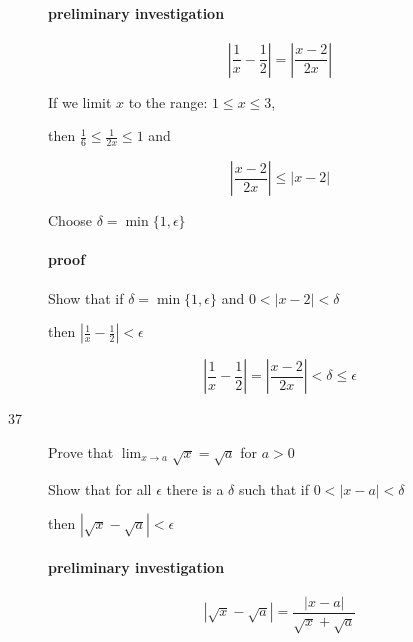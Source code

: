 \documentclass[letterpaper, landscape]{exam}
\begin{document}
\begin{description}
        \paragraph{preliminary investigation}

        \[
          \left| \frac{1}{x} - \frac{1}{2} \right| = \left| \frac{x - 2}{2x} \right| 
        \]

        If we limit $x$ to the range: $1 \leq x \leq 3$, 
        
        then $\frac{1}{6} \leq \frac{1}{2x} \leq 1$ and

        \[
          \left| \frac{x - 2}{2x} \right| \leq |x - 2|
        \]

        Choose $\delta = \min \{ 1, \epsilon \}$

        \paragraph{proof}
        Show that if $\delta = \min \{ 1, \epsilon \}$ and 
        $0 < |x - 2| < \delta$ 
        
        then $\left| \frac{1}{x} - \frac{1}{2} \right| < \epsilon$

        \[
          \left| \frac{1}{x} - \frac{1}{2} \right| = \left| \frac{x - 2}{2x} \right| < \delta \leq \epsilon
        \]


      \newpage

      \item[37] Prove that $\lim_{x \to a} \sqrt{x} = \sqrt{a}$ for $a > 0$

        Show that for all $\epsilon$ there is a $\delta$ such that if 
        $0 < |x - a| < \delta$ 
        
        then $\left| \sqrt{x} - \sqrt{a} \right| < \epsilon$

        \paragraph{preliminary investigation}

        \[
          \left| \sqrt{x} - \sqrt{a} \right| = \frac{|x - a|}{\sqrt{x} + \sqrt{a}} 
        \]



\end{description}
\end{document}
